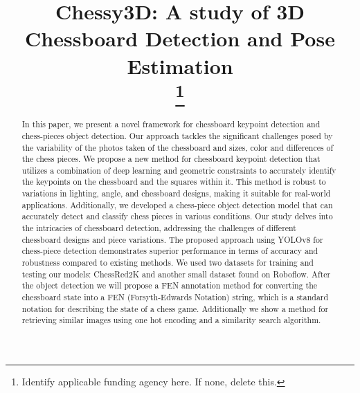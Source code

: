 \documentclass[conference]{IEEEtran}
\begin{document}
\title{Chessy3D: A study of 3D Chessboard Detection and Pose Estimation\\
\thanks{Identify applicable funding agency here. If none, delete this.}
}

\author{
\and
{}
\and
{}
}

\maketitle

\begin{abstract}
In this paper, we present a novel framework for chessboard keypoint detection
 and chess-pieces object detection. 
Our approach tackles the significant challenges posed by the variability
 of the photos taken of the chessboard and sizes, color and differences of the chess pieces.
We propose a new method for chessboard keypoint detection that utilizes a combination of
 deep learning and geometric constraints to accurately identify the keypoints on the chessboard
 and the squares within it.
This method is robust to variations in lighting, angle, and chessboard designs,
making it suitable for real-world applications.
Additionally, we developed a chess-piece object detection model that can accurately detect and classify chess pieces in various conditions.
Our study delves into the intricacies of chessboard detection, addressing the challenges of different chessboard designs and piece variations.
The proposed approach using YOLOv8 for chess-piece detection
 demonstrates superior performance in terms of accuracy and robustness compared to existing methods.
We used two datasets for training and testing our models: ChessRed2K and another small dataset found on Roboflow.
After the object detection we will propose a FEN annotation method for converting the chessboard state into a
 FEN (Forsyth-Edwards Notation) string, which is a standard notation for describing the state of a chess game.
Additionally we show a method for retrieving similar images using one hot encoding
 and a similarity search algorithm.
\end{abstract}
\end{document}

